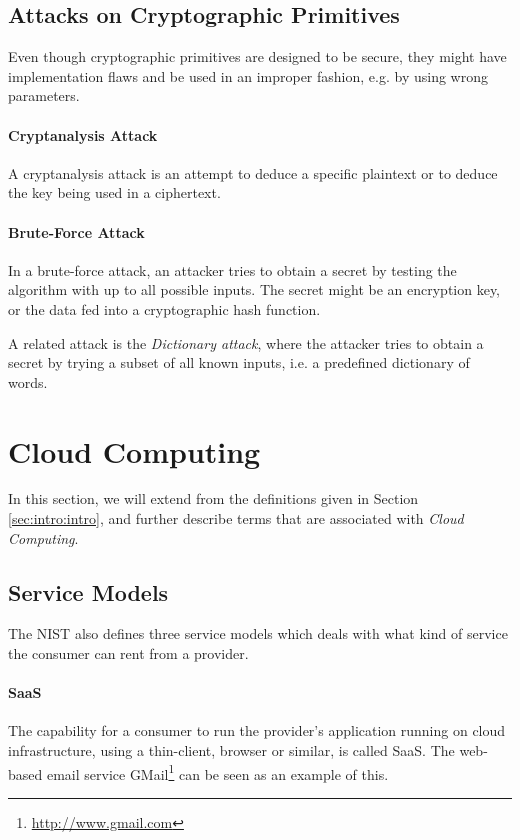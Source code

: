 \documentclass[pdftex,english,10pt,b5paper,twoside]{book}
\begin{document}
\subsection{Attacks on Cryptographic Primitives}

Even though cryptographic primitives are designed to be secure, they might have
implementation flaws and be used in an improper fashion, e.g. by using wrong
parameters.

\paragraph{Cryptanalysis Attack} A cryptanalysis attack is an attempt to deduce
a specific plaintext or to deduce the key being used in a ciphertext.

\paragraph{Brute-Force Attack} In a brute-force attack, an attacker tries
to obtain a secret by testing the algorithm with up to all possible inputs. The
secret might be an encryption key, or the data fed into a cryptographic hash
function.

A related attack is the \emph{Dictionary attack}, where the attacker
tries to obtain a secret by trying a subset of all known inputs, i.e. a
predefined dictionary of words.

\section{Cloud Computing}

In this section, we will extend from the definitions given in Section
\ref{sec:intro:intro}, and further describe terms that are associated with
\emph{Cloud Computing}.

\subsection{Service Models}
The \ac{NIST} also defines three service models which deals with what kind of
service the consumer can rent from a provider.

\paragraph{\ac{SaaS}} The capability for a consumer to run the provider's
application running on cloud infrastructure, using a thin-client, browser or
similar, is called \ac{SaaS}. The web-based email service
GMail\footnote{\url{http://www.gmail.com}} can be seen as an example of this.
\end{document}
